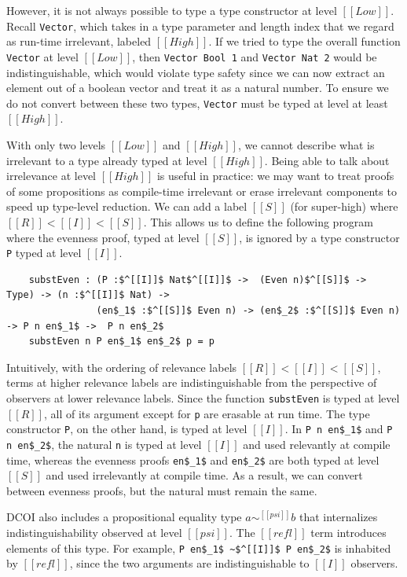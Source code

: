 \documentclass[acmsmall]{acmart}
\newcommand{\name}{DCOI\xspace}
\begin{document}
However, it is not always possible to type a type constructor at level $[[Low]]$.
Recall \lstinline{Vector}, which takes in a type parameter and length index that
we regard as run-time irrelevant, labeled $[[High]]$. If we tried to type the overall
function \lstinline{Vector} at level $[[Low]]$, then
\lstinline{Vector Bool 1} and \lstinline{Vector Nat 2} would be indistinguishable,
which would violate type safety since we can now extract an element
out of a boolean vector and treat it as a natural number.
To ensure we do not convert between these two types,
\lstinline{Vector} must be typed at level at least $[[High]]$.

With only two levels $[[Low]]$ and $[[High]]$,
we cannot describe what is irrelevant to a type
already typed at level $[[High]]$. Being able to talk about
irrelevance at level $[[High]]$ is useful in practice: we may want to treat
proofs of some propositions as compile-time irrelevant or erase
irrelevant components to speed up type-level reduction.
We can add a label $[[S]]$ (for super-high) where
$[[R]] < [[I]] < [[S]]$. This allows us to define the following
program where the evenness proof, typed at level $[[S]]$, is ignored
by a type constructor \lstinline{P} typed at level $[[I]]$.

\begin{lstlisting}
    substEven : (P :$^[[I]]$ Nat$^[[I]]$ ->  (Even n)$^[[S]]$ ->  Type) -> (n :$^[[I]]$ Nat) ->
                (en$_1$ :$^[[S]]$ Even n) -> (en$_2$ :$^[[S]]$ Even n) -> P n en$_1$ ->  P n en$_2$
    substEven n P en$_1$ en$_2$ p = p
\end{lstlisting}

Intuitively, with the ordering of relevance labels $[[R]] < [[I]] < [[S]]$,
terms at higher relevance labels are indistinguishable
from the perspective of observers at lower relevance labels.
Since the function \lstinline{substEven} is typed at level
$[[R]]$, all of its argument except for \lstinline{p} are
erasable at run time. The type constructor \lstinline{P},
on the other hand, is typed at
level $[[I]]$. In \lstinline{P n en$_1$} and
\lstinline{P n en$_2$}, the natural \lstinline{n} is typed at
level $[[I]]$ and used relevantly at compile time, whereas the evenness proofs
\lstinline{en$_1$} and \lstinline{en$_2$} are both typed at level
$[[S]]$ and used irrelevantly at compile time. As a result, we can convert between
evenness proofs, but the natural must remain the same.

\name{} also includes a propositional equality type $a \sim^[[psi]] b$ 
that internalizes indistinguishability observed at level $[[psi]]$.
The $[[refl]]$ term introduces elements of this type. For example, 
\lstinline{P en$_1$ ~$^[[I]]$ P en$_2$} is inhabited by $[[refl]]$,
since the two arguments are
indistinguishable to $[[I]]$ observers.
\end{document}
